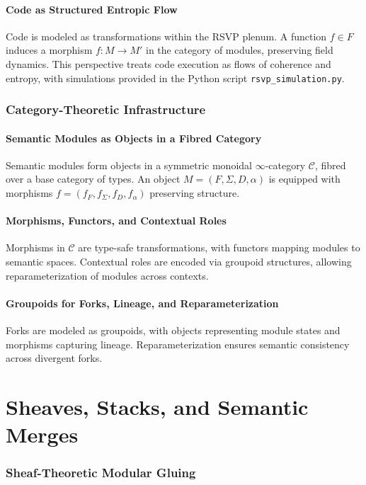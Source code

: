 \documentclass[12pt]{article}
\begin{document}
\subsection{Code as Structured Entropic Flow}
Code is modeled as transformations within the RSVP plenum. A function $f \in F$ induces a morphism $f: M \to M'$ in the category of modules, preserving field dynamics. This perspective treats code execution as flows of coherence and entropy, with simulations provided in the Python script \texttt{rsvp\_simulation.py}.

\section{Category-Theoretic Infrastructure}
\subsection{Semantic Modules as Objects in a Fibred Category}
Semantic modules form objects in a symmetric monoidal $\infty$-category $\mathcal{C}$, fibred over a base category of types. An object $M = (F, \Sigma, D, \alpha)$ is equipped with morphisms $f = (f_F, f_\Sigma, f_D, f_\alpha)$ preserving structure.

\subsection{Morphisms, Functors, and Contextual Roles}
Morphisms in $\mathcal{C}$ are type-safe transformations, with functors mapping modules to semantic spaces. Contextual roles are encoded via groupoid structures, allowing reparameterization of modules across contexts.

\subsection{Groupoids for Forks, Lineage, and Reparameterization}
Forks are modeled as groupoids, with objects representing module states and morphisms capturing lineage. Reparameterization ensures semantic consistency across divergent forks.

\part{Sheaves, Stacks, and Semantic Merges}

\section{Sheaf-Theoretic Modular Gluing}
\end{document}
